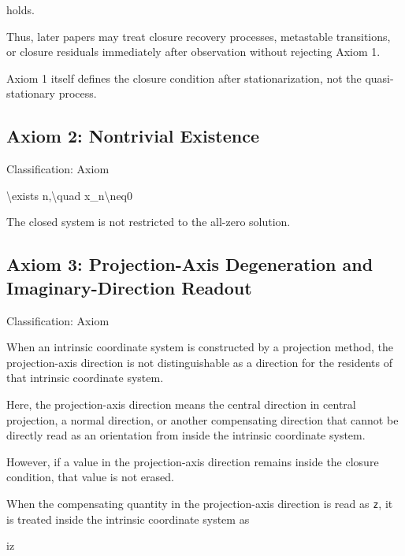 \documentclass[
  a4paper,
]{article}
\newenvironment{Shaded}{}{}
\newcommand{\NormalTok}[1]{#1}
\begin{document}
holds.

Thus, later papers may treat closure recovery processes, metastable
transitions, or closure residuals immediately after observation without
rejecting Axiom 1.

Axiom 1 itself defines the closure condition after stationarization, not
the quasi-stationary process.

\subsection{Axiom 2: Nontrivial
Existence}\label{axiom-2-nontrivial-existence}

Classification: Axiom

\begin{Shaded}
\begin{Highlighting}[]
\NormalTok{\textbackslash{}exists n,\textbackslash{}quad x\_n\textbackslash{}neq0}
\end{Highlighting}
\end{Shaded}

The closed system is not restricted to the all-zero solution.

\subsection{Axiom 3: Projection-Axis Degeneration and
Imaginary-Direction
Readout}\label{axiom-3-projection-axis-degeneration-and-imaginary-direction-readout}

Classification: Axiom

When an intrinsic coordinate system is constructed by a projection
method, the projection-axis direction is not distinguishable as a
direction for the residents of that intrinsic coordinate system.

Here, the projection-axis direction means the central direction in
central projection, a normal direction, or another compensating
direction that cannot be directly read as an orientation from inside the
intrinsic coordinate system.

However, if a value in the projection-axis direction remains inside the
closure condition, that value is not erased.

When the compensating quantity in the projection-axis direction is read
as \texttt{z}, it is treated inside the intrinsic coordinate system as

\begin{Shaded}
\begin{Highlighting}[]
\NormalTok{iz}
\end{Highlighting}
\end{Shaded}
\end{document}
